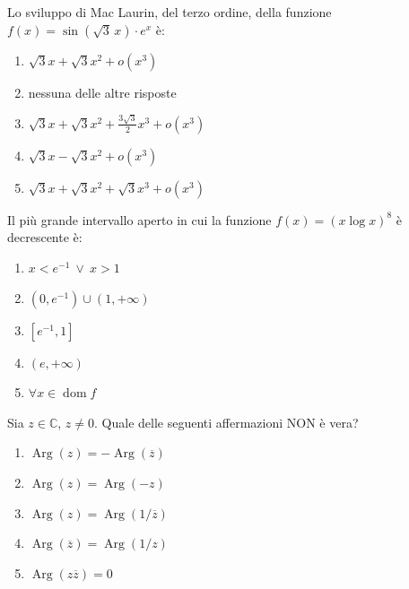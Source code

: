 \begin{quiz}
Lo sviluppo di Mac Laurin, del terzo ordine, della funzione $f(x)=\sin(\sqrt3\,x)\cdot e^x$ \`e:
\begin{enumerate}
\item $\sqrt3x+\sqrt3x^2+o(x^3)$
\item nessuna delle altre risposte
\item $\sqrt3x+\sqrt3x^2+\frac{3\sqrt3}{2}x^3+o(x^3)$
\item $\sqrt3x-\sqrt3x^2+o(x^3)$
\item $\sqrt3x+\sqrt3x^2+\sqrt3x^3+o(x^3)$
\end{enumerate}
\end{quiz}

\begin{quiz}
Il pi\`u grande intervallo aperto in cui la funzione $f(x)=(x\log x)^8$ \`e decrescente \`e:
\begin{enumerate}
\item $x<e^{-1}\ \lor\ x>1$
\item $(0,e^{-1})\cup(1,+\infty)$
\item $[e^{-1},1]$
\item $(e,+\infty)$
\item $\forall x\in\operatorname{dom}f$
\end{enumerate}
\end{quiz}

\begin{quiz}
Sia $z\in\mathbb C$, $z\neq0$. Quale delle seguenti affermazioni NON \`e vera?
\begin{enumerate}
\item $\operatorname{Arg}(z)=-\operatorname{Arg}(\overline z)$
\item $\operatorname{Arg}(z)=\operatorname{Arg}(-z)$
\item $\operatorname{Arg}(z)=\operatorname{Arg}(1/\overline z)$
\item $\operatorname{Arg}(\overline z)=\operatorname{Arg}(1/z)$
\item $\operatorname{Arg}(z\overline z)=0$
\end{enumerate}
\end{quiz}

